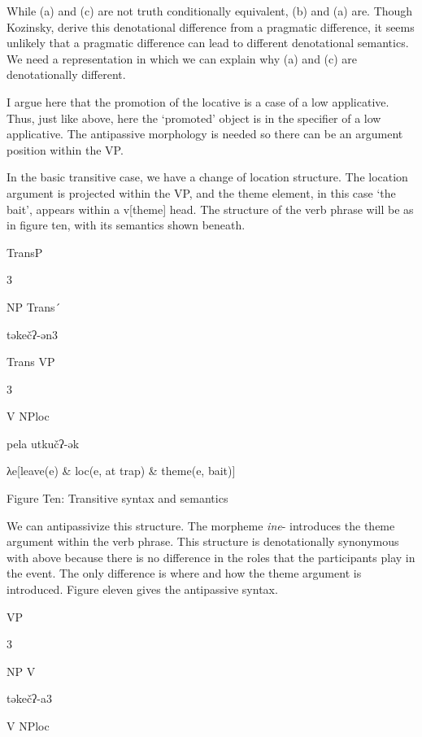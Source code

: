 \documentclass[output=paper,modfonts,nonflat]{langsci/langscibook}
\begin{document}
While (a) and (c) are not truth conditionally equivalent, (b) and (a) are. Though Kozinsky, \citet{NedjalkovPolinskaja1988} derive this denotational difference from a pragmatic difference, it seems unlikely that a pragmatic difference can lead to different denotational semantics. We need a representation in which we can explain why (a) and (c) are denotationally different.

I argue here that the promotion of the locative is a case of a low applicative. Thus, just like above, here the ‘promoted’ object is in the specifier of a low applicative.  The antipassive morphology is needed so there can be an argument position within the VP.

In the basic transitive case, we have a change of location structure.  The location argument is projected within the VP, and the theme element, in this case ‘the bait’, appears within a v[theme] head. The structure of the verb phrase will be as in figure ten, with its semantics shown beneath. 

            TransP

                 3                  

              NP    Trans´ 

                   təkečʔ-ən3

                    Trans         VP

                        3

      V             NPloc

    pela           utkučʔ-ək

    λe[leave(e) \& loc(e, at trap) \& theme(e, bait)]

\begin{stylecaption}
Figure Ten: Transitive syntax and semantics
\end{stylecaption}

We can antipassivize this structure.  The morpheme \textit{ine}{}- introduces the theme argument within the verb phrase.  This structure is denotationally synonymous with  above because there is no difference in the roles that the participants play in the event.  The only difference is where and how the theme argument is introduced.  Figure eleven gives the antipassive syntax.

               VP

      3

     NP            V

təkečʔ-a3

   V    NPloc
\end{document}
